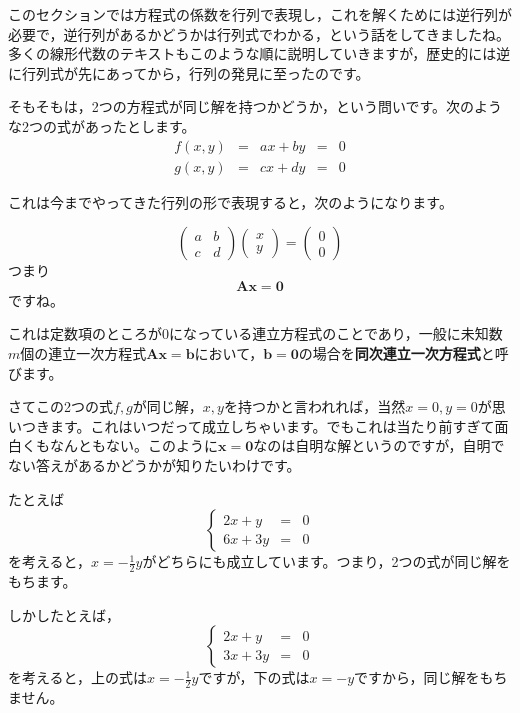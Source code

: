 \documentclass{ltjsbook}
\begin{document}
このセクションでは方程式の係数を行列で表現し，これを解くためには逆行列が必要で，逆行列があるかどうかは行列式でわかる，という話をしてきましたね。多くの線形代数のテキストもこのような順に説明していきますが，歴史的には逆に行列式が先にあってから，行列の発見に至ったのです\parencite{Takeuchi2010}。

そもそもは，2つの方程式が同じ解を持つかどうか，という問いです。次のような2つの式があったとします。
\[
	\begin{array}{ccccc}
		f(x,y) & = & ax + by & = & 0 \\
		g(x,y) & = & cx + dy & = & 0
	\end{array}
\]

これは今までやってきた行列の形で表現すると，次のようになります。

\[ \begin{pmatrix} a & b \\c & d \end{pmatrix}\begin{pmatrix}x\\y\end{pmatrix} =
	\begin{pmatrix}0\\0\end{pmatrix}\]
つまり
\[ \bm{Ax} = \bm{0} \]
ですね。

これは定数項のところが0になっている連立方程式のことであり，一般に未知数$m$個の連立一次方程式$\bm{Ax}=\bm{b}$において，$\bm{b}=\bm{0}$の場合を\textbf{同次連立一次方程式}と呼びます。

さてこの2つの式$f,g$が同じ解，$x,y$を持つかと言われれば，当然$x=0,y=0$が思いつきます。これはいつだって成立しちゃいます。でもこれは当たり前すぎて面白くもなんともない。このように$\bm{x} = \bm{0}$なのは自明な解というのですが，自明でない答えがあるかどうかが知りたいわけです。

たとえば
\[
	\left \{
	\begin{array}{lll}
		2x+y  & = & 0 \\
		6x+3y & = & 0
	\end{array}
	\right.
\]
を考えると，$x = -\frac{1}{2}y$がどちらにも成立しています。つまり，2つの式が同じ解をもちます。

しかしたとえば，
\[
	\left \{
	\begin{array}{lll}
		2x+y  & = & 0 \\
		3x+3y & = & 0
	\end{array}
	\right.
\]
を考えると，上の式は$x = -\frac{1}{2}y$ですが，下の式は$x=-y$ですから，同じ解をもちません。
\end{document}
